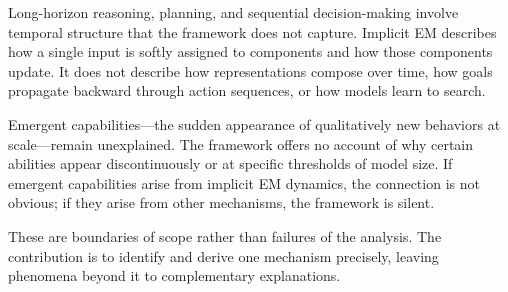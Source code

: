 Long-horizon reasoning, planning, and sequential decision-making involve temporal structure that the framework does not capture. Implicit EM describes how a single input is softly assigned to components and how those components update. It does not describe how representations compose over time, how goals propagate backward through action sequences, or how models learn to search.

Emergent capabilities---the sudden appearance of qualitatively new behaviors at scale---remain unexplained. The framework offers no account of why certain abilities appear discontinuously or at specific thresholds of model size. If emergent capabilities arise from implicit EM dynamics, the connection is not obvious; if they arise from other mechanisms, the framework is silent.

These are boundaries of scope rather than failures of the analysis. The contribution is to identify and derive one mechanism precisely, leaving phenomena beyond it to complementary explanations.
